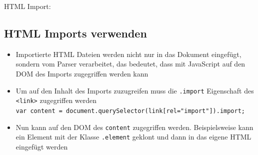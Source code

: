 HTML Import:

\begin{Shaded}
\begin{Highlighting}[]
  \KeywordTok{>}
\end{Highlighting}
\end{Shaded}

\subsection{HTML Imports verwenden}\label{html-imports-verwenden}

\begin{itemize}
\tightlist
\item
  Importierte HTML Dateien werden nicht nur in das Dokument eingefügt,
  sondern vom Parser verarbeitet, das bedeutet, dass mit JavaScript auf
  den DOM des Imports zugegriffen werden kann
\item
  Um auf den Inhalt des Imports zuzugreifen muss die \texttt{.import}
  Eigenschaft des \texttt{\textless{}link\textgreater{}} zugegriffen
  werden
  \texttt{var\ content\ =\ document.querySelector(\textquotesingle{}link{[}rel="import"{]}\textquotesingle{}).import;}
\item
  Nun kann auf den DOM des \texttt{content} zugegriffen werden.
  Beispielsweise kann ein Element mit der Klasse \texttt{.element}
  geklont und dann in das eigene HTML eingefügt werden
\end{itemize}

\begin{Shaded}
\begin{Highlighting}[]
  \KeywordTok{>}
     \OperatorTok{=} \NormalTok{(}\OperatorTok{;}

     \OperatorTok{=} \NormalTok{(}\NormalTok{)}\OperatorTok{;}

    \NormalTok{(}\NormalTok{(}\NormalTok{))}\OperatorTok{;}
  \OperatorTok{<}
\OperatorTok{>}
\end{Highlighting}
\end{Shaded}

